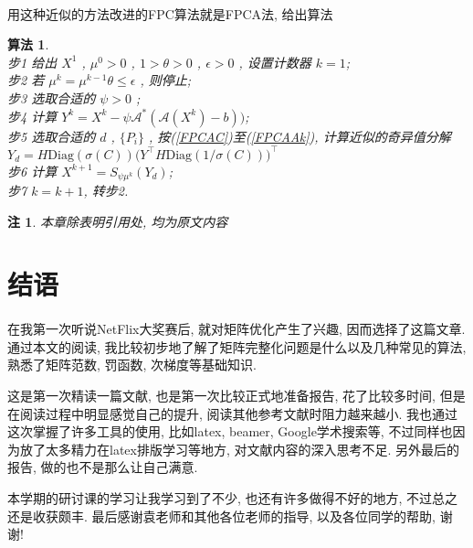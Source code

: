 \documentclass[a4paper, UTF8]{ctexart}				%
\newtheorem{remark}{\bf 注}
\newtheorem{algo}{\bf 算法}
\numberwithin{equation}{section}				%
\newcommand{\upcite}[1]{\textsuperscript{\textsuperscript{\cite{#1}}}}
\begin{document}
			\paragraph{}
				\quad 用这种近似的方法改进的FPC算法就是FPCA法, 给出算法
				\begin{algo}
					\quad\\
					步1 \quad 给出 $X^1$ , $\mu^0 > 0$ , $1 > \theta > 0$ , $\epsilon > 0$ , 设置计数器 $k = 1$;\\
					步2 \quad 若 $\mu^k = \mu^{k -1} \theta \le \epsilon$ , 则停止;\\
					步3 \quad 选取合适的 $\psi > 0$ ;\\
					步4 \quad 计算 $Y^k = X^k - \psi \mathcal{A}^*(\mathcal{A}(X^k) - b))$;\\
					步5 \quad 选取合适的 $d$ , $\{P_i\}$ , 按(\ref{FPCAC})至(\ref{FPCAAk}), 计算近似的奇异值分解 $Y_d = H \text{Diag}(\sigma(C)) \big(Y ^\top H \text{Diag}(1/\sigma(C))\big)^\top$\\
					步6 \quad 计算 $X^{k + 1} = S_{\psi \mu^k}(Y_d)$;\\
					步7 \quad $k = k + 1$, 转步2.\\
				\end{algo}
		
		\begin{remark}
			本章除表明引用处, 均为原文\upcite{goldfarb2009solving}内容
		\end{remark}

	\section{结语}
		\paragraph{}
			\quad 在我第一次听说NetFlix大奖赛后, 就对矩阵优化产生了兴趣, 因而选择了这篇文章. 通过本文的阅读, 我比较初步地了解了矩阵完整化问题是什么以及几种常见的算法, 熟悉了矩阵范数, 罚函数, 次梯度等基础知识.
			
			这是第一次精读一篇文献, 也是第一次比较正式地准备报告, 花了比较多时间, 但是在阅读过程中明显感觉自己的提升, 阅读其他参考文献时阻力越来越小. 我也通过这次掌握了许多工具的使用, 比如latex, beamer, Google学术搜索等, 不过同样也因为放了太多精力在latex排版学习等地方, 对文献内容的深入思考不足. 另外最后的报告, 做的也不是那么让自己满意.
			
			本学期的研讨课的学习让我学习到了不少, 也还有许多做得不好的地方, 不过总之还是收获颇丰. 最后感谢袁老师和其他各位老师的指导, 以及各位同学的帮助, 谢谢!

	
	
\end{document}
